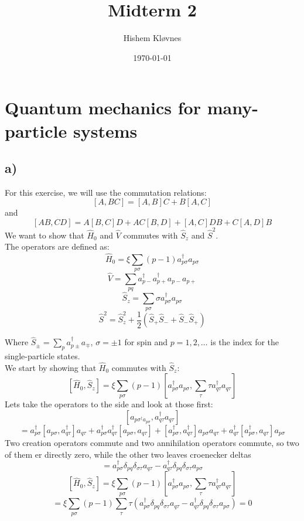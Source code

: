 \documentclass[a4paper,12pt]{article}
\title{Midterm 2}
\author{Hishem Kløvnes}
\date{\today}
\begin{document}
\maketitle
\section{Quantum mechanics for many-particle systems}


\subsection*{a)}
For this exercise, we will use the commutation relations: 
$$[A,BC] = [A,B]C + B[A,C]$$
and
$$[AB,CD] = A[B,C]D + AC[B,D] + [A,C]DB + C[A,D]B$$
We want to show that $\hat{ H}_0$ and $ \hat{ V}$ commutes with $\hat{ S}_z$ and $\hat{ S}^2$.\\ The operators are defined as:
$$\hat{ H}_0 =ξ  ∑_{ p σ }^{} (p-1)a_{p σ}^{†}a_{p σ}$$
$$\hat{ V} = ∑_{pq}^{} a_{p-}^{†}a_{p+}^{†} a_{p-}a_{p+}$$
$$\hat{ S}_z = ∑_{p σ }^{}σ a_{p σ}^{†}a_{p σ }$$
$$\hat{ S}^2 = \hat{ S}_z^2 + \frac{1}{2}(\hat{ S}_+ \hat{ S}_- + \hat{ S}_- \hat{ S}_+)$$

Where $\hat{ S}_\pm = ∑_{p}^{} a_{p ± }^{†} a_{∓ }$, $σ =±  1$ for spin and $p = 1,2, \ldots  $ is the index for the single-particle states.\\
We start by showing that $\hat{ H}_0$ commutes with $\hat{ S}_z$:
$$[\hat{ H}_0, \hat{ S}_z] = ξ  ∑_{ p σ }^{} (p-1)[a_{p σ}^{†}a_{p σ},∑_{τ}^{}τ  a_{q τ }^{†}a_{q τ}]$$
Lets take the operators to the side and look at those first:
$$[a_{p σ^{†} a_{p σ}}, a_{q τ }^{†} a_{q τ }]$$
$$ = a_{p σ}^{†} [a_{p σ }, a _{q τ}^{†}] a_{q τ} 
+a_{p σ}^{†} a _{q τ}^{†}[a_{p σ }, a_{q τ}] 
+  [a_{p σ}^{†}, a _{q τ}^{†}] a_{p σ }a_{q τ}
+ a _{q τ}^{†} [a_{p σ}^{†}, a_{q τ}] a_{p σ }$$
Two creation operators commute and two annihilation operators commute, so two of them er directly zero, while the other two leaves croenecker deltas\\
$$ = a_{p σ}^{†} δ_{pq} δ_{στ} a_{q τ} -a_{q τ}^{†} δ_{pq} δ_{στ} a_{p σ}$$
$$[\hat{ H}_0, \hat{ S}_z] = ξ  ∑_{ p σ }^{} (p-1)[a_{p σ}^{†}a_{p σ},∑_{τ}^{}τ  a_{q τ }^{†}a_{q τ}]$$
$$ = ξ  ∑_{ p σ }^{} (p-1)∑_{τ}^{}τ( a_{p σ}^{†} δ_{pq}δ_{σ τ}a_{q τ} - a_{q τ}^{†} δ_{pq}δ_{σ τ}a_{p σ}) = 0$$
\end{document}
